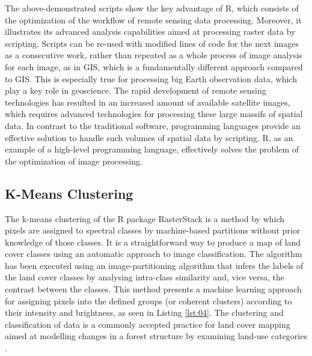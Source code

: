 \documentclass[applsci,article,accept,pdftex,moreauthors]{Definitions/mdpi}
\begin{document}
The above-demonstrated scripts show the key advantage of R, which consists of the optimization of the workflow of remote sensing data processing. Moreover, it illustrates its advanced analysis capabilities aimed at processing raster data by scripting. Scripts can be re-used with modified lines of code for the next images as a consecutive work, rather than repeated as a whole process of image analysis for each image, as in GIS, which is a fundamentally different approach compared to GIS. This is especially true for processing big Earth observation data, which play a key role in geoscience. The rapid development of remote sensing technologies has resulted in an increased amount of available satellite images, which requires advanced technologies for processing these large massifs of spatial data. In contrast to the traditional software, programming languages provide an effective solution to handle such volumes of spatial data by scripting. R, as an example of a high-level programming language, effectively solves the problem of the optimization of image processing.

\subsection{K-Means Clustering}
The k-means %
 clustering of the R package RasterStack is a method by which pixels are assigned to spectral classes by machine-based partitions without prior knowledge of those classes. It is a straightforward way to produce a map of land cover classes using an automatic approach to image classification. The algorithm has been executed using an image-partitioning algorithm that infers the labels of the land cover classes by analysing intra-class similarity and, vice versa, the contrast between the classes. This method presents a machine learning approach for assigning pixels into the defined groups (or coherent clusters) according to their intensity and brightness, as seen in Listing \ref{lst:04}. The clustering and classification of data is a commonly accepted practice for land cover mapping aimed at modelling changes in a forest structure by examining land-use categories  \cite{Manakos,WILKIE1988307,4780136,rs11242999,land11060787}.
\end{document}
